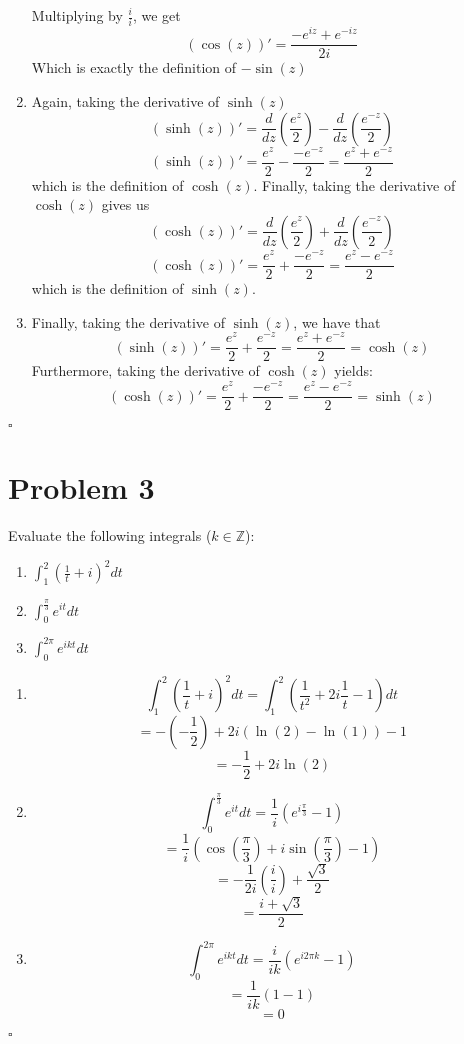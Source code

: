 \documentclass[12pt]{article}
\newcommand{\Z}{\mathbb{Z}}
\newenvironment{proof}{\noindent{\bf Proof.}}{\hfill $\square$\medskip}
\begin{document}
\begin{proof}
\begin{enumerate}[label=\textbf{(\alph*)}]
    Multiplying by $\frac{i}{i}$, we get
    $$(\cos(z))'=\frac{-e^{iz}+e^{-iz}}{2i}$$
    Which is exactly the definition of $-\sin(z)$
    \item Again, taking the derivative of $\sinh(z)$
    $$(\sinh(z))'=\frac{d}{dz}\left(\frac{e^{z}}{2}\right)-\frac{d}{dz}\left(\frac{e^{-z}}{2}\right)$$
    $$(\sinh(z))'=\frac{e^{z}}{2}-\frac{-e^{-z}}{2}=\frac{e^{z}+e^{-z}}{2}$$
    which is the definition of $\cosh(z)$.
    Finally, taking the derivative of $\cosh(z)$ gives us
    $$(\cosh(z))'=\frac{d}{dz}\left(\frac{e^{z}}{2}\right)+\frac{d}{dz}\left(\frac{e^{-z}}{2}\right)$$
    $$(\cosh(z))'=\frac{e^{z}}{2}+\frac{-e^{-z}}{2}=\frac{e^{z}-e^{-z}}{2}$$
    which is the definition of $\sinh(z)$.
    \item Finally, taking the derivative of $\sinh(z)$, we have that
    $$(\sinh(z))'=\frac{e^{z}}{2}+\frac{e^{-z}}{2}=\frac{e^{z}+e^{-z}}{2}=\cosh(z)$$
    Furthermore, taking the derivative of $\cosh(z)$ yields:
    $$(\cosh(z))'=\frac{e^{z}}{2}+\frac{-e^{-z}}{2}=\frac{e^{z}-e^{-z}}{2}=\sinh(z)$$
\end{enumerate}
\end{proof}


\newpage
\section{Problem 3}
Evaluate the following integrals ($k\in\Z$):
\begin{enumerate}[label=\textbf{(\alph*)}]
    \item $\int_{1}^{2}(\frac{1}{t}+i)^{2}dt$
    \item $\int_{0}^{\frac{\pi}{3}}e^{it}dt$
    \item $\int_{0}^{2\pi}e^{ikt}dt$
\end{enumerate}

\begin{proof}
\begin{enumerate}[label=\textbf{(\alph*)}]
    \item
    $$\int_{1}^{2}\left(\frac{1}{t}+i\right)^{2}dt=\int_{1}^{2}\left(\frac{1}{t^{2}}+2i\frac{1}{t}-1\right)dt$$
    $$=-(-\frac{1}{2})+2i(\ln(2)-\ln(1))-1$$
    $$=-\frac{1}{2}+2i\ln(2)$$
    \item
    $$\int_{0}^{\frac{\pi}{3}}e^{it}dt=\frac{1}{i}\left(e^{i\frac{\pi}{3}}-1\right)$$
    $$=\frac{1}{i}(\cos\left(\frac{\pi}{3}\right)+i\sin\left(\frac{\pi}{3}\right)-1)$$
    $$=-\frac{1}{2i}\left(\frac{i}{i}\right)+\frac{\sqrt{3}}{2}$$
    $$=\frac{i+\sqrt{3}}{2}$$
    \item
    $$\int_{0}^{2\pi}e^{ikt}dt=\frac{i}{ik}(e^{i2\pi k}-1)$$
    $$=\frac{1}{ik}(1-1)$$
    $$=0$$
\end{enumerate}
\end{proof}
\end{document}
